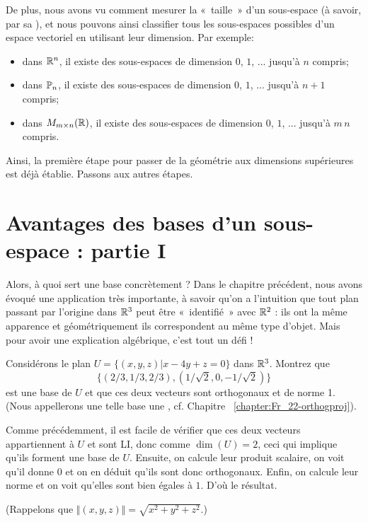 De plus, nous avons vu comment mesurer la «~taille~» d'un sous-espace (à savoir, par sa ), et nous pouvons ainsi classifier tous les sous-espaces possibles
d'un espace vectoriel en utilisant leur dimension. Par exemple:
\begin{itemize}
	\item dans $\mathbb{R}^n$, il existe des sous-espaces de dimension $0$, $1$, ... jusqu'à $n$ compris;
	\item dans $\mathbb{P}_n$, il existe des sous-espaces de dimension $0$, $1$, ... jusqu'à $n+1$ compris;
	\item dans $M_{m\times n}(\mathbb{R})$, il existe des sous-espaces de dimension $0$, $1$, ... jusqu'à $m\,n$ compris.\\
\end{itemize}

Ainsi, la première étape pour passer de la géométrie aux dimensions supérieures est déjà \'etablie. Passons aux autres étapes.

\section{Avantages des bases d'un sous-espace : partie I}

Alors, à quoi sert une base concrètement ?  Dans le chapitre précédent, nous avons \'evoqu\'e une 
application très importante, à savoir qu'on a l'intuition que tout
plan passant par l'origine dans $\mathbb{R}^3$ peut \^etre «~identifi\'e~» avec $\mathbb{R}^2$ : ils ont la même apparence et géométriquement ils correspondent au même type d'objet. Mais pour avoir une explication algébrique, c'est tout un défi !

\begin{myprob} Considérons le plan $U = \{ (x,y,z) | x-4y+z = 0\}$ dans $\mathbb{R}^3$.
Montrez que $$\{(2/3,1/3,2/3), (1/\sqrt{2},0,-1/\sqrt{2})\}$$ est
une base de $U$ et que ces deux vecteurs sont
orthogonaux et de norme 1.  (Nous appellerons une telle base
une , cf. Chapitre ~\ref{chapter:Fr_22-orthogproj}).   

\begin{mysol}  Comme précédemment, il est facile de vérifier que ces deux
vecteurs appartiennent \`a $U$ et sont LI, donc comme $\dim(U)=2$, ceci qui implique qu'ils forment une base de $U$. Ensuite, on calcule leur produit scalaire, on voit qu'il donne $0$ et on en déduit qu'ils sont donc orthogonaux.  Enfin, on calcule leur
norme et on voit qu'elles sont bien égales à $1$. D'où le résultat.

(Rappelons que $\Vert (x,y,z) \Vert = \sqrt{x^2+y^2+z^2}$.)\end{mysol}\end{myprob}


